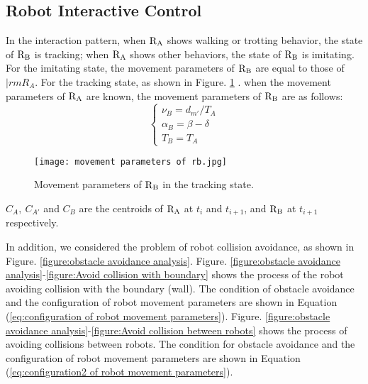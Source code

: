 \subsection{Robot Interactive Control}
In the interaction pattern, when $\rm R_A$ shows walking or trotting behavior,
the state of $\rm R_B$ is tracking; when $\rm R_A$ shows other behaviors, the
state of $\rm R_B$ is imitating. For the imitating state, the movement
parameters of $\rm R_B$ are equal to those of $|rm R_A$. For the tracking state,
as shown in Figure. \ref{figure:movement parameters of RB in the tracking state}
. when the movement parameters of $\rm R_A$ are known, the movement parameters
of $\rm R_B$ are as follows:
\begin{equation} \label{eq:movement parameters}
    \begin{cases}
        \nu_B=d_{m'}/T_A \\
        \alpha_B=\beta - \delta \\
        T_B=T_A
    \end{cases}
\end{equation}
\begin{figure}[h]
    \centering
    \texttt{[image: movement parameters of rb.jpg]}
    \caption{Movement parameters of $\rm R_B$ in the tracking state.}
    \label{figure:movement parameters of RB in the tracking state}
\end{figure}
$C_A,~C_{A'}$ and $C_B$ are the centroids of $\rm R_A$ at $t_i$ and $t_{i+1}$,
and $\rm R_B$ at $t_{i+1}$ respectively.

In addition, we considered the problem of robot collision avoidance, as shown in
Figure. \ref{figure:obstacle avoidance analysis}. Figure. \ref{figure:obstacle
avoidance analysis}-\ref{figure:Avoid collision with boundary} shows the process
of the robot avoiding collision with the boundary (wall). The condition of
obstacle avoidance and the configuration of robot movement parameters are shown
in Equation (\ref{eq:configuration of robot movement parameters}). Figure.
\ref{figure:obstacle avoidance analysis}-\ref{figure:Avoid collision between
robots} shows the process of avoiding collisions between robots. The condition
for obstacle avoidance and the configuration of robot movement parameters are
shown in Equation (\ref{eq:configuration2 of robot movement parameters}).

